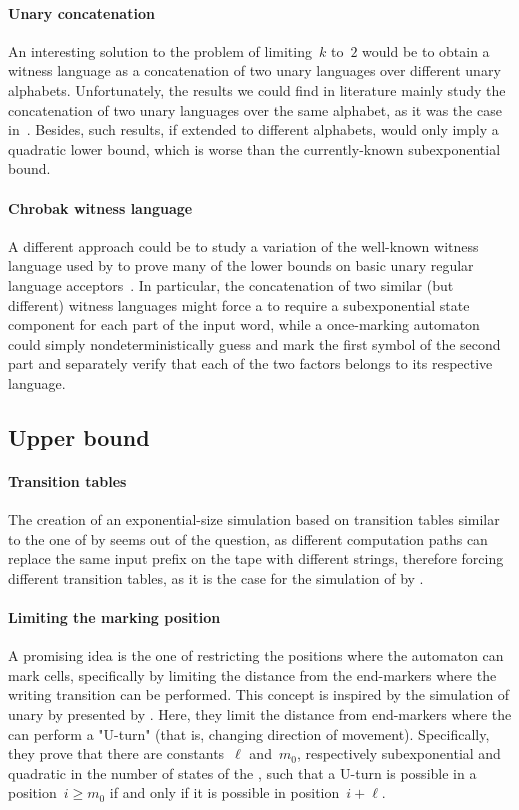 \paragraph{Unary concatenation} An interesting solution to the problem of limiting~$k$ to~$2$ would be to obtain a witness language as a concatenation of two unary languages over different unary alphabets.
Unfortunately, the results we could find in literature mainly study the concatenation of two unary languages over the same alphabet, as it was the case in~\cite{YuZhu+94,PigSha02}.
Besides, such results, if extended to different alphabets, would only imply a quadratic lower bound, which is worse than the currently-known subexponential bound.

\paragraph{Chrobak witness language} A different approach could be to study a variation of the well-known witness language used by \citeauthor{Chr86} to prove many of the lower bounds on basic unary regular language acceptors~\cite{Chr86}.
In particular, the concatenation of two similar (but different) witness languages might force a \ODFA to require a subexponential state component for each part of the input word, while a once-marking automaton could simply nondeterministically guess and mark the first symbol of the second part and separately verify that each of the two factors belongs to its respective language.


\subsection{Upper bound}

\paragraph{Transition tables} The creation of an exponential-size simulation based on transition tables similar to the one of \TNFAs by \ODFAs seems out of the question, as different computation paths can replace the same input prefix on the tape with different strings, therefore forcing different transition tables, as it is the case for the simulation of \OLAs by \ODFAs.

\paragraph{Limiting the marking position} A promising idea is the one of restricting the positions where the automaton can mark cells, specifically by limiting the distance from the end-markers where the writing transition can be performed.
This concept is inspired by the simulation of unary \TNFAs by \ODFAs presented by .
Here, they limit the distance from end-markers where the \TNFA can perform a "U-turn" (that is, changing direction of movement).
Specifically, they prove that there are constants~$\ell$ and~$m_0$, respectively subexponential and quadratic in the number of states of the \TNFA, such that a U-turn is possible in a position~$i\ge m_0$ if and only if it is possible in position~$i+\ell$.

